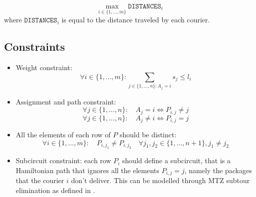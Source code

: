 \[ \max_{i \in \{1, \dots, m\}} \texttt{DISTANCES}_i  \]
where $\texttt{DISTANCES}_i$ is equal to the distance traveled by each courier.

\subsection{Constraints}

\begin{itemize}
    \item Weight constraint: 
    \begin{equation}
        \forall i \in \{ 1, \dots, m \}: \sum_{j \in \{1, \dots, n\}: A_j = i} s_j \leq l_i 
    \end{equation}

    \item Assignment and path constraint:
    \begin{equation}
        \forall j \in \{1, \dots, n\}: \quad A_j = i \Longleftrightarrow P_{i,j} \neq j
    \end{equation}
    \begin{equation}
        \forall j \in \{1, \dots, n\}: \quad A_j \neq i \Longleftrightarrow P_{i,j} = j
    \end{equation}

    \item All the elements of each row of $P$ should be distinct:
    \begin{equation}
        \forall i \in \{1, \dots, m\}: \quad P_{i,j_1} \neq P_{i,j_2} \quad \forall j_1,j_2 \in \{1, \dots, n+1\}, j_1 \neq j_2 
    \end{equation}



    \item Subcircuit constraint: each row $P_i$ should define a subcircuit, that is a Hamiltonian path that ignores all the elements $P_{i,j} = j$, namely the packages that the courier $i$ don't deliver. This can be modelled through MTZ subtour elimination as defined in .

\end{itemize}


